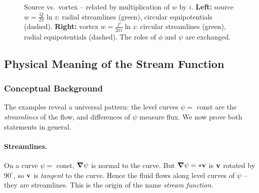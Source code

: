 \documentclass[../main.tex]{subfiles}
\begin{document}
\begin{figure}[h]
\centering
{}
\caption{Source vs.\ vortex -- related by multiplication of $w$ by $i$. \textbf{Left:} source $w=\tfrac{Q}{2\pi}\ln z$: radial streamlines (green), circular equipotentials (dashed). \textbf{Right:} vortex $w=\tfrac{\Gamma}{2\pi i}\ln z$: circular streamlines (green), radial equipotentials (dashed). The roles of $\phi$ and $\psi$ are exchanged.}
\label{fig:lec17_source_vortex}
\end{figure}

\subsection{Physical Meaning of the Stream Function}\label{sec:lec17:psi_meaning}

\subsubsection*{Conceptual Background}
The examples reveal a universal pattern: the level curves $\psi=$ const are the \emph{streamlines} of the flow, and differences of $\psi$ measure flux. We now prove both statements in general.

\paragraph{Streamlines.} On a curve $\psi=$ const, $\grad\psi$ is normal to the curve. But $\grad\psi=\ast\mathbf{v}$ is $\mathbf{v}$ rotated by $90^\circ$, so $\mathbf{v}$ is \emph{tangent} to the curve. Hence the fluid flows along level curves of $\psi$ -- they are streamlines. This is the origin of the name \emph{stream function}.
\end{document}
